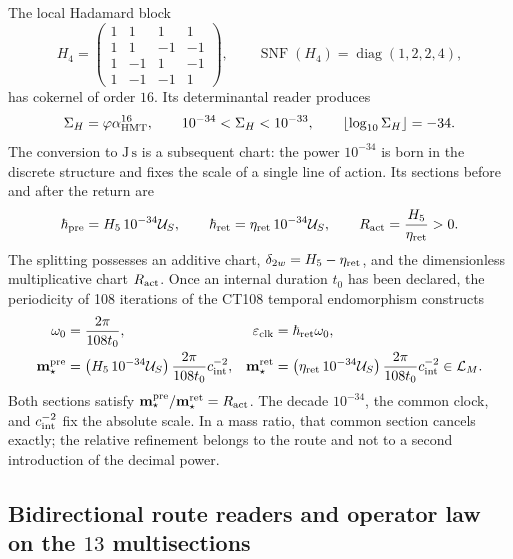 The local Hadamard block
\[
 H_4=
 \begin{pmatrix}
  1&1&1&1\\
  1&1&-1&-1\\
  1&-1&1&-1\\
  1&-1&-1&1
 \end{pmatrix},
 \qquad
 \operatorname{SNF}(H_4)=\operatorname{diag}(1,2,2,4),
\]
has cokernel of order \(16\). Its determinantal reader produces
\begin{equation}
 \Sigma_H=\varphi\alpha_{\rm HMT}^{16},
 \qquad
 10^{-34}<\Sigma_H<10^{-33},
 \qquad
 \left\lfloor\log_{10}\Sigma_H\right\rfloor=-34.
 \label{eq:orden-menos-34-tabla-masas}
\end{equation}
The conversion to \(\mathrm{J\,s}\) is a subsequent chart: the power
\(10^{-34}\) is born in the discrete structure and fixes the scale of a single line
of action. Its sections before and after the return are
\begin{equation}
 \hbar_{\rm pre}=H_5\,10^{-34}\mathcal U_S,\qquad
 \hbar_{\rm ret}=\eta_{\rm ret}\,10^{-34}\mathcal U_S,
 \qquad
 R_{\rm act}=\frac{H_5}{\eta_{\rm ret}}>0.
 \label{eq:accion-absoluta-y-razon-tabla-masas}
\end{equation}
The splitting possesses an additive chart,
\(\delta_{2w}=H_5-\eta_{\rm ret}\), and the dimensionless multiplicative chart
\(R_{\rm act}\). Once an internal duration \(t_0\) has been declared, the periodicity of
108 iterations of the CT108 temporal endomorphism constructs
\begin{align}
 \omega_0&=\frac{2\pi}{108t_0},
 &\varepsilon_{\rm clk}&=\hbar_{\rm ret}\omega_0,
 \label{eq:cuanto-reloj-masa-rectora}\\
 \mathbf m_\star^{\rm pre}
 &=\left(H_5\,10^{-34}\mathcal U_S\right)
   \frac{2\pi}{108t_0}c_{\rm int}^{-2},
 &\mathbf m_\star^{\rm ret}
 &=\left(\eta_{\rm ret}\,10^{-34}\mathcal U_S\right)
   \frac{2\pi}{108t_0}c_{\rm int}^{-2}\in\mathcal L_M.
 \label{eq:seccion-reloj-masa-rectora}
\end{align}
Both sections satisfy \(\mathbf m_\star^{\rm pre}/\mathbf m_\star^{\rm ret}=R_{\rm act}\). The decade \(10^{-34}\), the common
clock, and \(c_{\rm int}^{-2}\) fix the absolute scale. In a mass ratio, that common
section cancels exactly; the relative refinement belongs to the route and
not to a second introduction of the decimal power.

\subsection{Bidirectional route readers and operator law on the \(13\) multisections}

